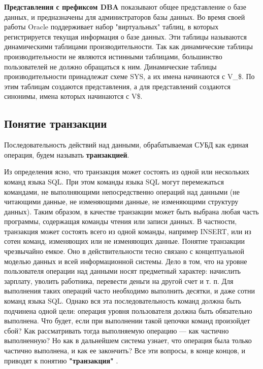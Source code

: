 \textbf{Представления с префиксом DBA} показывают общее представление о базе
данных, и предназначены для администраторов базы данных.
Во время своей работы Oracle поддерживает набор "виртуальных" таблиц,
в которых регистрируется текущая информация о базе данных. Эти таблицы
называются динамическими таблицами производительности. Так как динамические таблицы производительности не являются истинными таблицами,
большинство пользователей не должно обращаться к ним. Динамические
таблицы производительности принадлежат схеме SYS, а их имена начинаются
с V\_\$. По этим таблицам создаются представления, а для представлений создаются синонимы, имена которых начинаются с V\$.

\subsection{Понятие транзакции}
\begin{grayquote}
Последовательность действий над данными, обрабатываемая СУБД как единая
операция, будем называть \textbf{транзакцией}.
\end{grayquote}
Из определения ясно, что транзакция может состоять из одной или нескольких команд языка SQL. При этом команды языка SQL могут перемежаться
командами, не выполняющими непосредственно операций над данными (не
читающими данные, не изменяющими данные, не изменяющими структуру
данных). Таким образом, в качестве транзакции может быть выбрана любая
часть программы, содержащая команды чтения или записи данных. В частности, транзакция может состоять всего из одной команды, например INSERT,
или из сотен команд, изменяющих или не изменяющих данные.
Понятие транзакции чрезвычайно емкое. Оно в действительности тесно связано с концептуальной моделью данных и всей информационной системы.
Дело в том, что на уровне пользователя операции над данными носят предметный характер: начислить зарплату, уволить работника, перевести деньги
на другой счет и т. п. Для выполнения таких операций часто необходимо выполнить десятки, и даже сотни команд языка SQL. Однако вся эта последовательность команд должна быть подчинена одной цели: операция уровня
пользователя должна быть обязательно выполнена. Что будет, если при выполнении такой цепочки команд произойдет сбой? Как рассматривать тогда
выполняемую операцию — как частично выполненную? Но как в дальнейшем система узнает, что операция была только частично выполнена, и как ее
закончить? Все эти вопросы, в конце концов, и приводят к понятию \textbf{"транзакция"} \autocite{Pirogov2009}.
